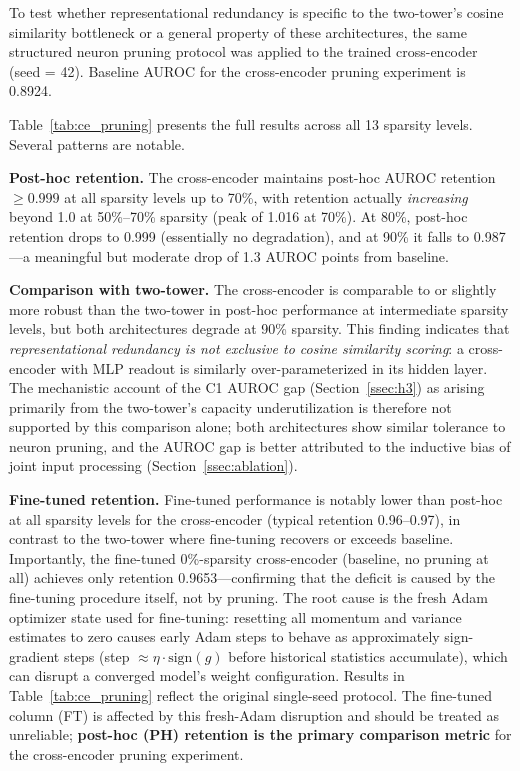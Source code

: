 \documentclass[journal]{IEEEtran}
\begin{document}
To test whether representational redundancy is specific to the two-tower's
cosine similarity bottleneck or a general property of these architectures,
the same structured neuron pruning protocol was applied to the trained
cross-encoder (seed = 42). Baseline AUROC for the cross-encoder pruning
experiment is 0.8924.

Table~\ref{tab:ce_pruning} presents the full results across all 13 sparsity
levels. Several patterns are notable.

\textbf{Post-hoc retention.} The cross-encoder maintains post-hoc AUROC
retention $\geq 0.999$ at all sparsity levels up to 70\%, with retention
actually \emph{increasing} beyond 1.0 at 50\%--70\% sparsity (peak of 1.016
at 70\%). At 80\%, post-hoc retention drops to 0.999 (essentially no
degradation), and at 90\% it falls to 0.987---a meaningful but moderate
drop of 1.3 AUROC points from baseline.

\textbf{Comparison with two-tower.} The cross-encoder is comparable to
or slightly more robust than the two-tower in post-hoc performance at
intermediate sparsity levels, but both architectures degrade at 90\% sparsity.
This finding indicates that \emph{representational redundancy is not exclusive
to cosine similarity scoring}: a cross-encoder with MLP readout is similarly
over-parameterized in its hidden layer. The mechanistic account of the C1
AUROC gap (Section~\ref{ssec:h3}) as arising primarily from the two-tower's
capacity underutilization is therefore not supported by this comparison alone;
both architectures show similar tolerance to neuron pruning, and the AUROC gap
is better attributed to the inductive bias of joint input processing
(Section~\ref{ssec:ablation}).

\textbf{Fine-tuned retention.} Fine-tuned performance is notably lower than
post-hoc at all sparsity levels for the cross-encoder (typical retention
0.96--0.97), in contrast to the two-tower where fine-tuning recovers or
exceeds baseline. Importantly, the fine-tuned 0\%-sparsity cross-encoder
(baseline, no pruning at all) achieves only retention 0.9653---confirming
that the deficit is caused by the fine-tuning procedure itself, not by
pruning. The root cause is the fresh Adam optimizer state used for
fine-tuning: resetting all momentum and variance estimates to zero causes
early Adam steps to behave as approximately sign-gradient steps
(step $\approx \eta \cdot \text{sign}(g)$ before historical statistics
accumulate), which can disrupt a converged model's weight configuration.
Results in Table~\ref{tab:ce_pruning} reflect the original single-seed
protocol. The fine-tuned column (FT) is affected by this fresh-Adam
disruption and should be treated as unreliable; \textbf{post-hoc (PH)
retention is the primary comparison metric} for the cross-encoder pruning
experiment.
\end{document}
